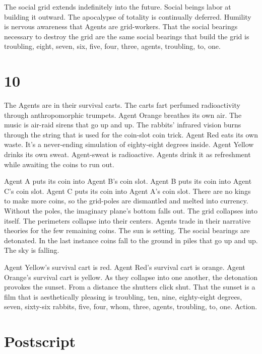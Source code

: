 \documentclass[
]{memoir}
\begin{document}
The social grid extends indefinitely into the future. Social beings
labor at building it outward. The apocalypse of totality is continually
deferred. Humility is nervous awareness that Agents are grid-workers.
That the social bearings necessary to destroy the grid are the same
social bearings that build the grid is troubling, eight, seven, six,
five, four, three, agents, troubling, to, one.

\hypertarget{section-11}{%
\section*{10}\label{section-11}}

The Agents are in their survival carts. The carts fart perfumed
radioactivity through anthropomorphic trumpets. Agent Orange breathes
its own air. The music is air-raid sirens that go up and up. The
rabbits' infrared vision burns through the string that is used for the
coin-slot coin trick. Agent Red eats its own waste. It's a never-ending
simulation of eighty-eight degrees inside. Agent Yellow drinks its own
sweat. Agent-sweat is radioactive. Agents drink it as refreshment while
awaiting the coins to run out.

Agent A puts its coin into Agent B's coin slot. Agent B puts its coin
into Agent C's coin slot. Agent C puts its coin into Agent A's coin
slot. There are no kings to make more coins, so the grid-poles are
dismantled and melted into currency. Without the poles, the imaginary
plane's bottom falls out. The grid collapses into itself. The perimeters
collapse into their centers. Agents trade in their narrative theories
for the few remaining coins. The sun is setting. The social bearings are
detonated. In the last instance coins fall to the ground in piles that
go up and up. The sky is falling.

Agent Yellow's survival cart is red. Agent Red's survival cart is
orange. Agent Orange's survival cart is yellow. As they collapse into
one another, the detonation provokes the sunset. From a distance the
shutters click shut. That the sunset is a film that is aesthetically
pleasing is troubling, ten, nine, eighty-eight degrees, seven, sixty-six
rabbits, five, four, whom, three, agents, troubling, to, one. Action.

\hypertarget{postscript}{%
\section*{Postscript}\label{postscript}}
\end{document}
